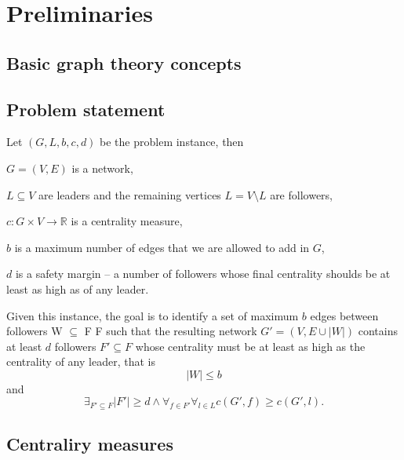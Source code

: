 \chapter{Preliminaries}


\section{Basic graph theory concepts}


\section{Problem statement}
\begin{definition}\label{HL}
    Let $(G, L, b, c, d)$ be the problem instance, then
    \begin{description}
        \item $G = (V, E)$ is a network,
        \item $L \subseteq V$ are leaders and the remaining vertices $L = V \setminus L$ are followers,
        \item $c : G \times V \rightarrow \mathbb{R}$ is a centrality measure,
        \item $b$ is a maximum number of edges that we are allowed to add in $G$,
        \item $d$ is a safety margin -- a number of followers whose final centrality shoulds be at least as high as of any leader.
    \end{description}
    Given this instance, the goal is to identify a set of maximum $b$ edges between followers W $\subseteq$ F {\texttimes} F
    such that the resulting network $G' = (V, E \cup |W|)$ contains at least $d$ followers $F' \subseteq F$
    whose centrality must be at least as high as the centrality of any leader, that is
    $$|W| \leq b$$
    and
    $$\exists_{F' \subseteq F} |F'| \geq d \wedge \forall_{f \in F'} \forall_{l \in L} c (G', f) \geq c (G', l).$$
\end{definition}



\section{Centraliry measures}

